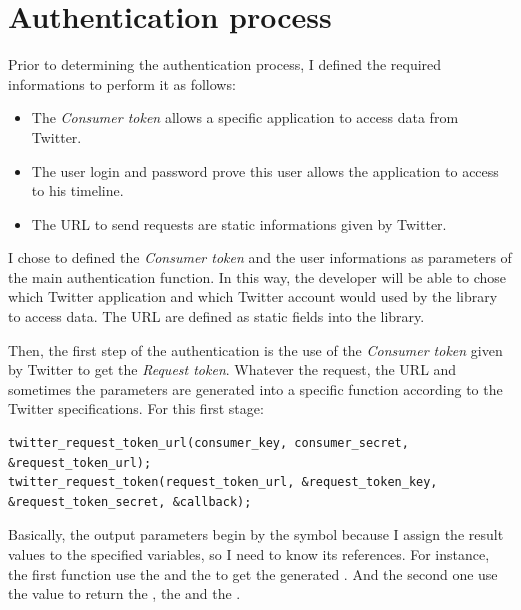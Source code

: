 \section{Authentication process}

\hspace{15mm}Prior to determining the authentication process, I defined the required informations to perform it as follows:
\begin{itemize}
\item The \textit{Consumer token} allows a specific application to access data from Twitter.
\item The user login and password prove this user allows the application to access to his timeline.
\item The URL to send requests are static informations given by Twitter.
\end{itemize}
I chose to defined the \textit{Consumer token} and the user informations as parameters of the main authentication function. In this way, the developer will be able to chose which Twitter application and which Twitter account would used by the library to access data. The URL are defined as static fields into the library.

Then, the first step of the authentication is the use of the \textit{Consumer token} given by Twitter to get the \textit{Request token}. Whatever the request, the URL and sometimes the parameters are generated into a specific function according to the Twitter specifications. For this first stage:
\begin{lstlisting}
twitter_request_token_url(consumer_key, consumer_secret, &request_token_url);
twitter_request_token(request_token_url, &request_token_key, &request_token_secret, &callback);
\end{lstlisting}
Basically, the output parameters begin by the \cfunction{\&} symbol because I assign the result values to the specified variables, so I need to know its references.
For instance, the first function use the  and the  to get the generated . And the second one use the  value to return the , the  and the .

